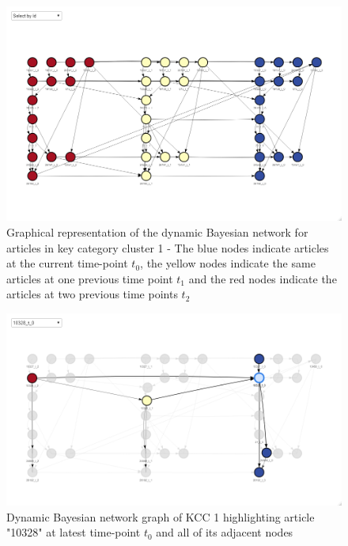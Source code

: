 


\begin{figure}[H]
\centering
  \includegraphics[width=0.95\linewidth]{figures/dbn_kcc_1_all.png}
  \caption{Graphical representation of the dynamic Bayesian network for articles in key category cluster 1 - The blue nodes indicate articles at the current time-point $t_0$, the yellow nodes indicate the same articles at one previous time point $t_1$ and the red nodes indicate the articles at two previous time points $t_2$}
  \label{fig:dbn_kcc_1_all}
\end{figure}




\begin{figure}[H]
\centering
  \includegraphics[width=0.95\linewidth]{figures/dbn_kcc_1_article_10328_t_0.png}
  \caption{Dynamic Bayesian network graph of KCC 1 highlighting article "10328" at latest time-point $t_0$ and all of its adjacent nodes}
  \label{fig:dbn_kcc_1_article_10328_t_0}
\end{figure}


